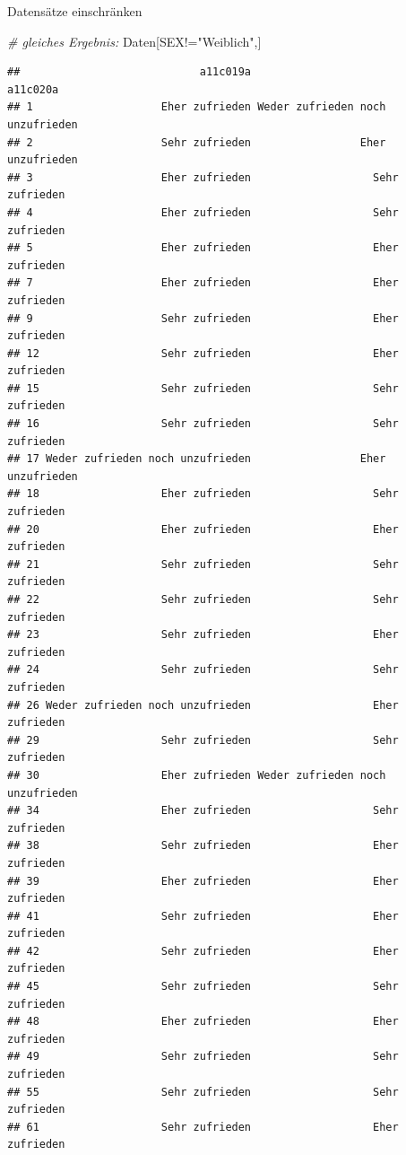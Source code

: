 \documentclass[ignorenonframetext,]{beamer}
\newenvironment{Shaded}{}{}
\newcommand{\StringTok}[1]{\textcolor[rgb]{0.25,0.44,0.63}{{#1}}}
\newcommand{\CommentTok}[1]{\textcolor[rgb]{0.38,0.63,0.69}{\textit{{#1}}}}
\newcommand{\NormalTok}[1]{{#1}}
\begin{document}
\begin{frame}[fragile]{Datensätze einschränken}
\begin{Shaded}
\begin{Highlighting}[]
\CommentTok{# gleiches Ergebnis:}
\NormalTok{Daten[SEX!=}\StringTok{"Weiblich"}\NormalTok{,]}
\end{Highlighting}
\end{Shaded}

\begin{verbatim}
##                            a11c019a                         a11c020a
## 1                    Eher zufrieden Weder zufrieden noch unzufrieden
## 2                    Sehr zufrieden                 Eher unzufrieden
## 3                    Eher zufrieden                   Sehr zufrieden
## 4                    Eher zufrieden                   Sehr zufrieden
## 5                    Eher zufrieden                   Eher zufrieden
## 7                    Eher zufrieden                   Eher zufrieden
## 9                    Sehr zufrieden                   Eher zufrieden
## 12                   Sehr zufrieden                   Eher zufrieden
## 15                   Sehr zufrieden                   Sehr zufrieden
## 16                   Sehr zufrieden                   Sehr zufrieden
## 17 Weder zufrieden noch unzufrieden                 Eher unzufrieden
## 18                   Eher zufrieden                   Sehr zufrieden
## 20                   Eher zufrieden                   Eher zufrieden
## 21                   Sehr zufrieden                   Sehr zufrieden
## 22                   Sehr zufrieden                   Sehr zufrieden
## 23                   Sehr zufrieden                   Eher zufrieden
## 24                   Sehr zufrieden                   Sehr zufrieden
## 26 Weder zufrieden noch unzufrieden                   Eher zufrieden
## 29                   Sehr zufrieden                   Sehr zufrieden
## 30                   Eher zufrieden Weder zufrieden noch unzufrieden
## 34                   Eher zufrieden                   Sehr zufrieden
## 38                   Sehr zufrieden                   Eher zufrieden
## 39                   Eher zufrieden                   Eher zufrieden
## 41                   Sehr zufrieden                   Eher zufrieden
## 42                   Sehr zufrieden                   Eher zufrieden
## 45                   Sehr zufrieden                   Sehr zufrieden
## 48                   Eher zufrieden                   Eher zufrieden
## 49                   Sehr zufrieden                   Sehr zufrieden
## 55                   Sehr zufrieden                   Sehr zufrieden
## 61                   Sehr zufrieden                   Eher zufrieden

\end{verbatim}
\end{frame}
\end{document}
